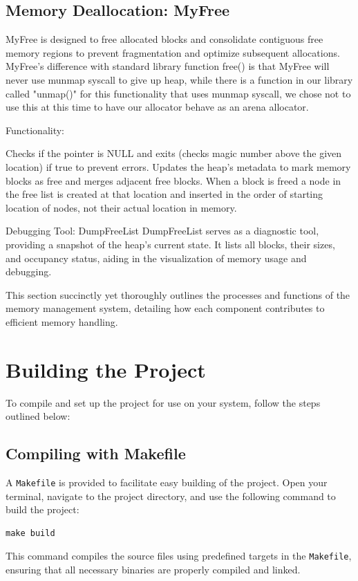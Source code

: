 \documentclass[conference]{IEEEtran}
\begin{document}
\subsection{Memory Deallocation: MyFree}
MyFree is designed to free allocated blocks and consolidate contiguous free memory regions to prevent fragmentation and optimize subsequent allocations.
MyFree's difference with standard library function free() is that MyFree will never use munmap syscall to give up heap, while there is a function in our library called "unmap()" for this functionality that uses munmap syscall, we chose not to use this at this time to have our allocator behave as an arena allocator.

Functionality:

Checks if the pointer is NULL and exits (checks magic number above the given location) if true to prevent errors.
Updates the heap's metadata to mark memory blocks as free and merges adjacent free blocks. When a block is freed a node in the free list is created at that location and inserted in the order of starting location of nodes, not their actual location in memory.

Debugging Tool: DumpFreeList
DumpFreeList serves as a diagnostic tool, providing a snapshot of the heap's current state. It lists all blocks, their sizes, and occupancy status, aiding in the visualization of memory usage and debugging.

This section succinctly yet thoroughly outlines the processes and functions of the memory management system, detailing how each component contributes to efficient memory handling.
\section{Building the Project}
To compile and set up the project for use on your system, follow the steps outlined below:

\subsection{Compiling with Makefile}
A \texttt{Makefile} is provided to facilitate easy building of the project. Open your terminal, navigate to the project directory, and use the following command to build the project:
\begin{lstlisting}
make build
\end{lstlisting}
This command compiles the source files using predefined targets in the \texttt{Makefile}, ensuring that all necessary binaries are properly compiled and linked.
\end{document}
